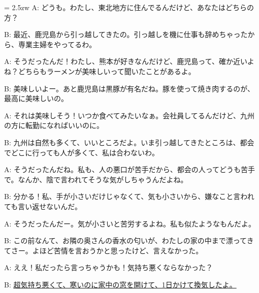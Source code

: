 \documentclass[11pt]{amsart}
\title{}
\author{}
\newenvironment{hangall}[1]{\hangindent = 2.5zw\everypar{\hangindent = 2.5zw}}{}
\begin{document}
\maketitle
\begin{hangall}{}%
A: どうも。わたし、東北地方に住んでるんだけど、あなたはどちらの方？

B: 最近、鹿児島から引っ越してきたの。引っ越しを機に仕事も辞めちゃったから、専業主婦をやってるわ。

A: そうだったんだ！わたし、熊本が好きなんだけど、鹿児島って、確か近いよね？どちらもラーメンが美味しいって聞いたことがあるよ。

B: 美味しいよー。あと鹿児島は黒豚が有名だね。豚を使って焼き肉するのが、最高に美味しいの。

A: それは美味しそう！いつか食べてみたいなぁ。会社員してるんだけど、九州の方に転勤になればいいのに。

B: 九州は自然も多くて、いいところだよ。いま引っ越してきたところは、都会でどこに行っても人が多くて、私は合わないわ。

A: そうだったんだね。私も、人の悪口が苦手だから、都会の人ってどうも苦手で。なんか、陰で言われてそうな気がしちゃうんだよね。

B: 分かる！私、手が小さいだけじゃなくて、気も小さいから、嫌なこと言われても言い返せないんだ。

A: そうだったんだー。気が小さいと苦労するよね。私も似たようなもんだよ。

B: この前なんて、お隣の奥さんの香水の匂いが、わたしの家の中まで漂ってきてさー。よほど苦情を言おうかと思ったけど、言えなかった。

A: ええ！私だったら言っちゃうかも！気持ち悪くならなかった？

B: \ul{超気持ち悪くて、寒いのに家中の窓を開けて、1日かけて換気したよ。}\end{hangall}
\end{document}
